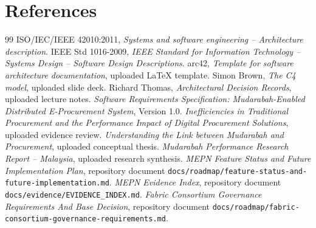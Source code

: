 \documentclass[11pt,a4paper]{article}
\begin{document}
\section{References}
\begin{thebibliography}{99}
 ISO/IEC/IEEE 42010:2011, \emph{Systems and software engineering -- Architecture description}.
 IEEE Std 1016-2009, \emph{IEEE Standard for Information Technology -- Systems Design -- Software Design Descriptions}.
 arc42, \emph{Template for software architecture documentation}, uploaded LaTeX template.
 Simon Brown, \emph{The C4 model}, uploaded slide deck.
 Richard Thomas, \emph{Architectural Decision Records}, uploaded lecture notes.
 \emph{Software Requirements Specification: Mudarabah-Enabled Distributed E-Procurement System}, Version 1.0.
 \emph{Inefficiencies in Traditional Procurement and the Performance Impact of Digital Procurement Solutions}, uploaded evidence review.
 \emph{Understanding the Link between Mudarabah and Procurement}, uploaded conceptual thesis.
 \emph{Mudarabah Performance Research Report -- Malaysia}, uploaded research synthesis.
 \emph{MEPN Feature Status and Future Implementation Plan}, repository document \texttt{docs/roadmap/feature-status-and-future-implementation.md}.
 \emph{MEPN Evidence Index}, repository document \texttt{docs/evidence/EVIDENCE\_INDEX.md}.
 \emph{Fabric Consortium Governance Requirements And Base Decision}, repository document \texttt{docs/roadmap/fabric-consortium-governance-requirements.md}.
\end{thebibliography}
\end{document}
